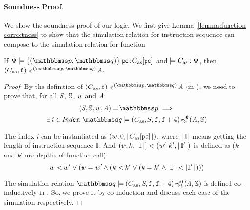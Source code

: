 \paragraph{\textbf{Soundness Proof.}}
We show the soundness proof of our logic.
We first give Lemma~\ref{lemma:function correctness}
to show that the simulation relation for instruction
sequence can compose to the simulation relation for
function.
\begin{lemma}
    \label{lemma:function correctness}
    If {\em $\semwffseqrel{\Cspec{}}{\relastP}{\relastQ}
                {\pc}{\asmimp[\pc]}$} and
    {\em $\models C_{\text{as}}:\Psi{}$}, then
    {\em $\simFunction{(\asmimp, \lab{})}
            {(\relastP, \, \relastQ)}{\primcom}$}.
\end{lemma}
\begin{proof}
    By the definition of
    $\simFunction{(\asmimp, \lab{})}
        {(\relastP, \, \relastQ)}{\primcom}$
    (in \Def{\ref{def:simfunc}}),
    we need to prove that, for all $S$, $\mathbb{S}$,
    $w$ and $\textit{A}$:
    \begin{multline*}
        \asrtmodel{(\state, \hpstate, \word, \primcom)}
            {\relastP} \implies \\
            \exists \, i \in \Index. \
            \simFunctionSt{\relastQ}{(\asmimp, \state, \lab{}, \lab{}+4)}
                {i}{0}{(\primcom, \hpstate)}
    \end{multline*}

    The index $i$ can be instantiated as
    $(w, 0, |\,C_{\text{as}}[\texttt{pc}]\,|)$, where $|\,\mathbb{I}\,|$ means
    getting the length of instruction sequence $\mathbb{I}$.
    And $(w, k, |\, \mathbb{I} \,|) < (w', k', |\,\mathbb{I}'\,|)$
    is defined as ($k$ and $k'$ are depths of function call):
    \[
        w < w' \lor
        (w = w' \land
        (k < k' \lor (k = k' \land
        |\,\mathbb{I}\,| < |\,\mathbb{I}'\,|)))
    \]

    The simulation relation $\simFunctionSt{\relastQ}{(\asmimp, \state, \lab{}, \lab{}+4)}
    {i}{0}{(\primcom, \hpstate)}$ is defined co-inductively
    in \Def{\ref{def:sim-imp-prim-state}}. So, we prove
    it by co-induction and discuss each case of the simulation
    respectively.
\end{proof}

